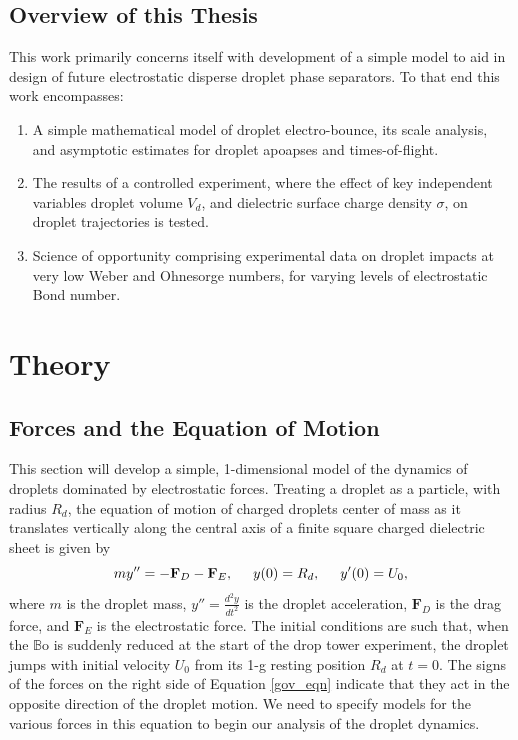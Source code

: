 \documentclass[12pt,a4paper,oneside]{book}
\begin{document}
\section{Overview of this Thesis}
This work primarily concerns itself with development of a simple model to aid in design of future electrostatic disperse droplet phase separators. To that end this work encompasses:
\begin{enumerate}
\item A simple mathematical model of droplet electro-bounce, its scale analysis, and asymptotic estimates for droplet apoapses and times-of-flight.
\item The results of a controlled experiment, where the effect of key independent variables droplet volume $V_d$, and dielectric surface charge density $\sigma$, on droplet trajectories is tested.
\item Science of opportunity comprising experimental data on droplet impacts at very low Weber and Ohnesorge numbers, for varying levels of electrostatic Bond number. 
\end{enumerate}

\chapter{Theory}
\section{Forces and the Equation of Motion}
This section will develop a simple, 1-dimensional model of the dynamics of droplets dominated by electrostatic forces. Treating a droplet as a particle, with radius $R_d$, the  equation of motion of charged droplets center of mass as it translates vertically along the central axis of a finite square charged dielectric sheet is given by
\begin{equation}
m y'' = - \mathbf{F}_D - \mathbf{F}_E, \hspace{5 mm} y(0) = R_d, \hspace{5 mm} y'(0) = U_0,
\label{gov_eqn}
\end{equation}
where $m$ is the droplet mass, $y'' = \frac{d^2 y}{d t^2}$ is the droplet acceleration, $\mathbf{F}_D$ is the drag force, and $\mathbf{F}_E$ is the electrostatic force. The initial conditions are such that, when the $\mathbb{B}\mbox{o}$ is suddenly reduced at the start of the drop tower experiment, the droplet jumps with initial velocity $U_0$ from its 1-g resting position $R_d$ at $t=0$. The signs of the forces on the right side of Equation \ref{gov_eqn} indicate that they act in the opposite direction of the droplet motion. We need to specify models for the various forces in this equation to begin our analysis of the droplet dynamics.
\end{document}
